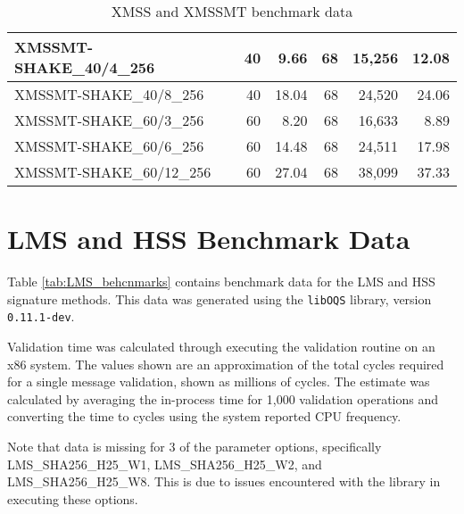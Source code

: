\documentclass{article}
\begin{document}
\begin{table}[tbp]
\begin{tabular}{|l|r|r|r|r|r|}
    XMSSMT-SHAKE\_40/4\_256 & 40 & 9.66 & 68 & 15,256 & 12.08 \\ \hline
    XMSSMT-SHAKE\_40/8\_256 & 40 & 18.04 & 68 & 24,520 & 24.06 \\ \hline
    XMSSMT-SHAKE\_60/3\_256 & 60 & 8.20 & 68 & 16,633 & 8.89 \\ \hline
    XMSSMT-SHAKE\_60/6\_256 & 60 & 14.48 & 68 & 24,511 & 17.98 \\ \hline
    XMSSMT-SHAKE\_60/12\_256 & 60 & 27.04 & 68 & 38,099 & 37.33 \\ \hline
    \end{tabular}
    \caption{XMSS and XMSSMT benchmark data}
    \label{tab:XMSS_behcnmarks}
\end{table}
\restoregeometry


\section{LMS and HSS Benchmark Data}
\label{appendix_lms}
Table \ref{tab:LMS_behcnmarks} contains benchmark data for the LMS and HSS signature methods.  This data was generated using the \texttt{libOQS} library, version \texttt{0.11.1-dev}\cite{StebilaMosca2017}.  

Validation time was calculated through executing the validation routine on an x86 system.  The values shown are an approximation of the total cycles required for a single message validation, shown as millions of cycles.  The estimate was calculated by averaging the in-process time for 1,000 validation operations and converting the time to cycles using the system reported CPU frequency.  

Note that data is missing for 3 of the parameter options, specifically LMS\_SHA256\_H25\_W1, LMS\_SHA256\_H25\_W2, and LMS\_SHA256\_H25\_W8.  This is due to issues encountered with the library in executing these options.  
\end{document}

